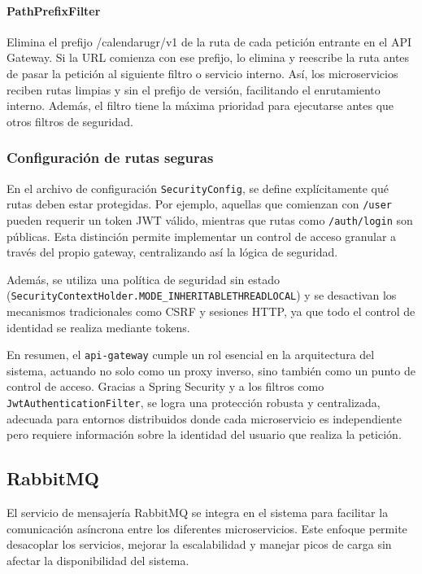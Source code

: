 \paragraph{PathPrefixFilter} Elimina el prefijo /calendarugr/v1 de la ruta de cada petición entrante en el API Gateway. Si la URL comienza con ese prefijo, lo elimina y reescribe la ruta antes de pasar la petición al siguiente filtro o servicio interno. Así, los microservicios reciben rutas limpias y sin el prefijo de versión, facilitando el enrutamiento interno. Además, el filtro tiene la máxima prioridad para ejecutarse antes que otros filtros de seguridad.

\subsubsection{Configuración de rutas seguras}

En el archivo de configuración \texttt{SecurityConfig}, se define explícitamente qué rutas deben estar protegidas. Por ejemplo, aquellas que comienzan con \texttt{/user} pueden requerir un token JWT válido, mientras que rutas como \texttt{/auth/login} son públicas. Esta distinción permite implementar un control de acceso granular a través del propio gateway, centralizando así la lógica de seguridad.

Además, se utiliza una política de seguridad sin estado (\texttt{SecurityContextHolder.MODE\_INHERITABLETHREADLOCAL}) y se desactivan los mecanismos tradicionales como CSRF y sesiones HTTP, ya que todo el control de identidad se realiza mediante tokens.

En resumen, el \texttt{api-gateway} cumple un rol esencial en la arquitectura del sistema, actuando no solo como un proxy inverso, sino también como un punto de control de acceso. Gracias a Spring Security y a los filtros como \texttt{JwtAuthenticationFilter}, se logra una protección robusta y centralizada, adecuada para entornos distribuidos donde cada microservicio es independiente pero requiere información sobre la identidad del usuario que realiza la petición.

\subsection{RabbitMQ}
El servicio de mensajería RabbitMQ se integra en el sistema para facilitar la comunicación asíncrona entre los diferentes microservicios. Este enfoque permite desacoplar los servicios, mejorar la escalabilidad y manejar picos de carga sin afectar la disponibilidad del sistema.

